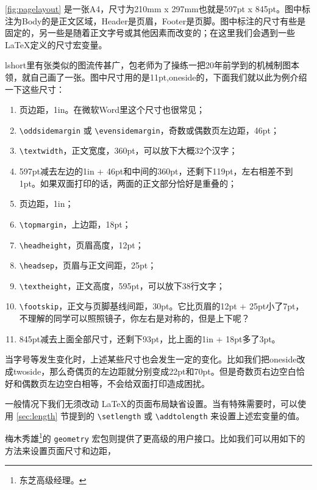 \autoref{fig:pagelayout} 是一张A4，尺寸为210mm x 297mm也就是597pt x 845pt。图中标注为Body的是正文区域，Header是页眉，Footer是页脚。图中标注的尺寸有些是固定的，另一些是随着正文字号或其他因素而改变的；在这里我们会遇到一些 \LaTeX 定义的尺寸宏变量。

lshort里有张类似的图流传甚广，包老师为了操练一把20年前学到的机械制图本领，就自己画了一张。图中尺寸用的是11pt,oneside的，下面我们就以此为例介绍一下这些尺寸：

\begin{enumerate}
    \item 页边距，1in。在微软Word里这个尺寸也很常见；
    \item \verb|\oddsidemargin| 或 \verb|\evensidemargin|，奇数或偶数页左边距，46pt；
    \item \verb|\textwidth|，正文宽度，360pt，可以放下大概32个汉字；
    \item 597pt减去左边的1in + 46pt和中间的360pt，还剩下119pt，左右相差不到1pt。如果双面打印的话，两面的正文部分恰好是重叠的；
    \item 页边距，1in；
    \item \verb|\topmargin|，上边距，18pt；
    \item \verb|\headheight|，页眉高度，12pt；
    \item \verb|\headsep|，页眉与正文间距，25pt；
    \item \verb|\textheight|，正文高度，595pt，可以放下38行文字；
    \item \verb|\footskip|，正文与页脚基线间距，30pt。它比页眉的12pt + 25pt小了7pt，不理解的同学可以照照镜子，你左右是对称的，但是上下呢？
    \item 845pt减去上面全部尺寸，还剩下93pt，比上面的1in + 18pt多了3pt。
\end{enumerate}

当字号等发生变化时，上述某些尺寸也会发生一定的变化。比如我们把oneside改成twoside，那么奇偶页的左边距就分别变成22pt和70pt。但是奇数页右边空白恰好和偶数页左边空白相等，不会给双面打印造成困扰。

一般情况下我们无须改动 \LaTeX 的页面布局缺省设置。当有特殊需要时，可以使用 \ref{sec:length} 节提到的 \verb|\setlength| 或 \verb|\addtolength| 来设置上述宏变量的值。

梅木秀雄\footnote{东芝高级经理。}的 \texttt{geometry} 宏包\citep{Umeki_2010}则提供了更高级的用户接口。比如我们可以用如下的方法来设置页面尺寸和边距，

\begin{Code}[]
\usepackage[paperwidth=100mm, paperheight=150mm, margin=20mm]{geometry}
\end{Code}

